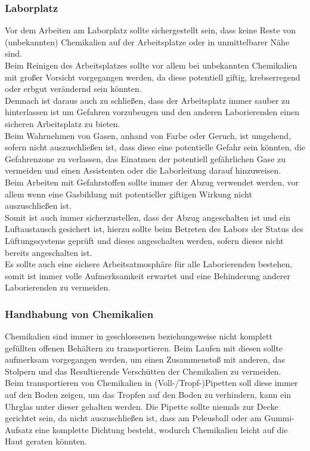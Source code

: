 \documentclass{article}
\begin{document}
\subsubsection{Laborplatz}
Vor dem Arbeiten am Laborplatz sollte sichergestellt sein, dass keine Reste von (unbekannten) Chemikalien auf der Arbeitsplatze oder in unmittelbarer Nähe sind.\\
Beim Reinigen des Arbeitsplatzes sollte vor allem bei unbekannten Chemikalien mit großer Vorsicht vorgegangen werden, da diese potentiell giftig, krebserregend oder erbgut verändernd sein könnten.\\
Demnach ist daraus auch zu schließen, dass der Arbeitsplatz immer sauber zu hinterlassen ist um Gefahren vorzubeugen und den anderen Laborierenden einen sicheren Arbeitsplatz zu bieten.\\
Beim Wahrnehmen von Gasen, anhand von Farbe oder Geruch, ist umgehend, sofern nicht auszuschließen ist, dass diese eine potentielle Gefahr sein könnten, die Gefahrenzone zu verlassen, das Einatmen der potentiell gefährlichen Gase zu vermeiden und einen Assistenten oder die Laborleitung darauf hinzuweisen.\\
Beim Arbeiten mit Gefahrstoffen sollte immer der Abzug verwendet werden, vor allem wenn eine Gasbildung mit potentieller giftigen Wirkung nicht auszuschließen ist.\\
Somit ist auch immer sicherzustellen, dass der Abzug angeschalten ist und ein Luftaustausch gesichert ist, hierzu sollte beim Betreten des Labors der Status des Lüftungssystems geprüft und dieses angeschalten werden, sofern dieses nicht bereits angeschalten ist.\\
Es sollte auch eine sichere Arbeitsatmosphäre für alle Laborierenden bestehen, somit ist immer volle Aufmerksamkeit erwartet und eine Behinderung anderer Laborierenden zu vermeiden.\\   

\subsubsection{Handhabung von Chemikalien}
Chemikalien sind immer in geschlossenen beziehungsweise nicht komplett gefüllten offenen Behältern zu transportieren. Beim Laufen mit diesen sollte aufmerksam vorgegangen werden, um einen Zusammenstoß mit anderen, das Stolpern und das Resultierende Verschütten der Chemikalien zu vermeiden.\\
Beim transportieren von Chemikalien in (Voll-/Tropf-)Pipetten soll diese immer auf den Boden zeigen, um das Tropfen auf den Boden zu verhindern, kann ein Uhrglas unter dieser gehalten werden. Die Pipette sollte niemals zur Decke gerichtet sein, da nicht auszuschließen ist, dass am Peleusball oder am Gummi-Aufsatz eine komplette Dichtung besteht, wodurch Chemikalien leicht auf die Haut geraten könnten.\\
\end{document}
